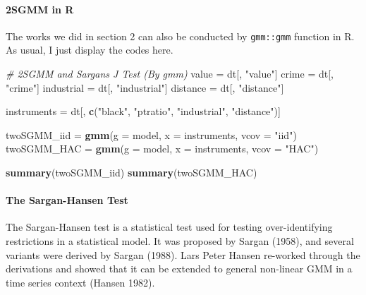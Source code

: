 \documentclass[
  12pt,
]{article}
\newenvironment{Shaded}{\begin{snugshade}}{\end{snugshade}}
\newcommand{\CommentTok}[1]{\textcolor[rgb]{0.56,0.35,0.01}{\textit{#1}}}
\newcommand{\DataTypeTok}[1]{\textcolor[rgb]{0.13,0.29,0.53}{#1}}
\newcommand{\KeywordTok}[1]{\textcolor[rgb]{0.13,0.29,0.53}{\textbf{#1}}}
\newcommand{\NormalTok}[1]{#1}
\newcommand{\StringTok}[1]{\textcolor[rgb]{0.31,0.60,0.02}{#1}}
\begin{document}
\hypertarget{sgmm-in-r}{%
\paragraph{2SGMM in R}\label{sgmm-in-r}}

The works we did in section 2 can also be conducted by \texttt{gmm::gmm} function in R. As usual, I just display the codes here.

\begin{Shaded}
\begin{Highlighting}[]
\CommentTok{\# 2SGMM and Sargan\textquotesingle{}s J Test (By gmm)}
\NormalTok{value =}\StringTok{ }\NormalTok{dt[, }\StringTok{"value"}\NormalTok{]}
\NormalTok{crime =}\StringTok{ }\NormalTok{dt[, }\StringTok{"crime"}\NormalTok{]}
\NormalTok{industrial =}\StringTok{ }\NormalTok{dt[, }\StringTok{"industrial"}\NormalTok{]}
\NormalTok{distance =}\StringTok{ }\NormalTok{dt[, }\StringTok{"distance"}\NormalTok{]}

\NormalTok{instruments =}\StringTok{ }\NormalTok{dt[, }\KeywordTok{c}\NormalTok{(}\StringTok{"black"}\NormalTok{, }\StringTok{"ptratio"}\NormalTok{, }\StringTok{"industrial"}\NormalTok{, }\StringTok{"distance"}\NormalTok{)]}

\NormalTok{twoSGMM\_iid =}\StringTok{ }\KeywordTok{gmm}\NormalTok{(}\DataTypeTok{g =}\NormalTok{ model, }\DataTypeTok{x =}\NormalTok{ instruments, }\DataTypeTok{vcov =} \StringTok{"iid"}\NormalTok{)}
\NormalTok{twoSGMM\_HAC =}\StringTok{ }\KeywordTok{gmm}\NormalTok{(}\DataTypeTok{g =}\NormalTok{ model, }\DataTypeTok{x =}\NormalTok{ instruments, }\DataTypeTok{vcov =} \StringTok{"HAC"}\NormalTok{)}

\KeywordTok{summary}\NormalTok{(twoSGMM\_iid)}
\KeywordTok{summary}\NormalTok{(twoSGMM\_HAC)}
\end{Highlighting}
\end{Shaded}

\hypertarget{the-sargan-hansen-test}{%
\paragraph{The Sargan-Hansen Test}\label{the-sargan-hansen-test}}

The Sargan-Hansen test is a statistical test used for testing over-identifying restrictions in a statistical model. It was proposed by Sargan (1958), and several variants were derived by Sargan (1988). Lars Peter Hansen re-worked through the derivations and showed that it can be extended to general non-linear GMM in a time series context (Hansen 1982).
\end{document}

